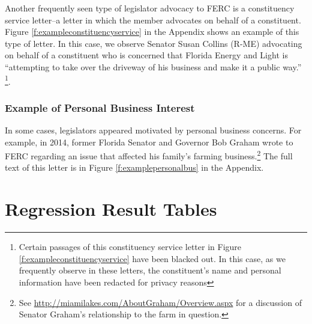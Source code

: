 Another frequently seen type of legislator advocacy to FERC is a constituency service letter--a letter in which the member advocates on behalf of a constituent.  Figure \ref{f:exampleconstituencyservice} in the Appendix shows an example of this type of letter. 
In this case, we observe Senator Susan Collins (R-ME) advocating on behalf of a constituent who is concerned that Florida Energy and Light is ``attempting to take over the driveway of his business and make it a public way.'' \footnote{Certain passages of this constituency service letter in Figure \ref{f:exampleconstituencyservice} have been blacked out. In this case, as we frequently observe in these letters, the constituent's name and personal information have been redacted for privacy reasons}. 


\subsubsection{Example of Personal Business Interest}

In some cases, legislators appeared motivated by personal business concerns.  For example, in 2014, former Florida Senator and Governor Bob Graham wrote to FERC regarding an issue that affected his family's farming business.\footnote{See  \url{http://miamilakes.com/AboutGraham/Overview.aspx} for a discussion of Senator Graham's relationship to the farm in question.}  The full text of this letter is in Figure \ref{f:examplepersonalbus} in the Appendix.


\clearpage
\section{Regression Result Tables}

\begin{table}[ht!]
    \centering
  

  \caption{\textbf{Table \ref{tab:bimoney}: Bivariate Models - Campaign Contributions and Letter-writing to FERC}. Bivariate Poisson Regression models predicting letter-writing activity to FERC using campaign contributions from the energy industry.}\label{tab:bimoney}
\end{table}

\begin{table}[ht!]
    \centering

  \caption{\textbf{Table \ref{tab:biparty}: Bivariate Models - Party and Letter-writing to FERC}. Bivariate Poisson Regression models predicting letter-writing activity to FERC using Legislator's Party.}\label{tab:biparty}
\end{table}

